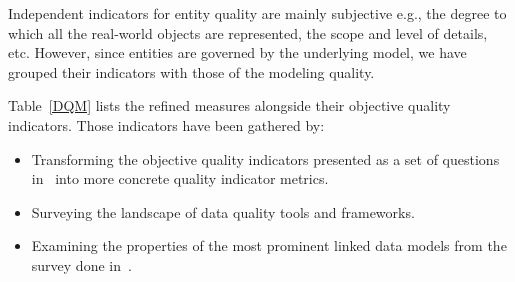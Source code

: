 \documentclass[a4paper,11pt,twoside]{ThesisStyle}
\begin{document}
Independent indicators for entity quality are mainly subjective e.g., the degree to which all the real-world objects are represented, the scope and level of details, etc. However, since entities are governed by the underlying model, we have grouped their indicators with those of the modeling quality.

Table~\ref{DQM} lists the refined measures alongside their objective quality indicators. Those indicators have been gathered by:

\begin{itemize}
	\item Transforming the objective quality indicators presented as a set of questions in~\cite{Assaf:DQMST:12} into more concrete quality indicator metrics.
	\item Surveying the landscape of data quality tools and frameworks.
	\item Examining the properties of the most prominent linked data models from the survey done in~\cite{Assaf:PROFILES:15}.
\end{itemize}
\end{document}
